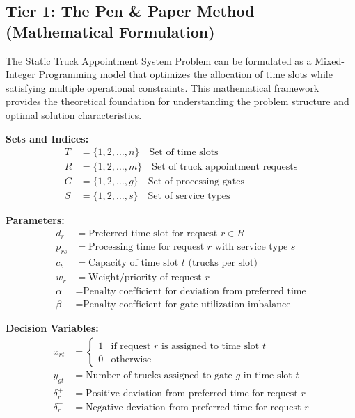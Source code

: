 \documentclass{article}
\begin{document}
\subsection{Tier 1: The Pen \& Paper Method (Mathematical Formulation)}

The Static Truck Appointment System Problem can be formulated as a Mixed-Integer Programming model that optimizes the allocation of time slots while satisfying multiple operational constraints. This mathematical framework provides the theoretical foundation for understanding the problem structure and optimal solution characteristics.

\textbf{Sets and Indices:}
\begin{align}
T &= \{1, 2, \ldots, n\} \quad \text{Set of time slots} \\
R &= \{1, 2, \ldots, m\} \quad \text{Set of truck appointment requests} \\
G &= \{1, 2, \ldots, g\} \quad \text{Set of processing gates} \\
S &= \{1, 2, \ldots, s\} \quad \text{Set of service types}
\end{align}

\textbf{Parameters:}
\begin{align}
d_r &= \text{Preferred time slot for request } r \in R \\
p_{rs} &= \text{Processing time for request } r \text{ with service type } s \\
c_t &= \text{Capacity of time slot } t \text{ (trucks per slot)} \\
w_r &= \text{Weight/priority of request } r \\
\alpha &= \text{Penalty coefficient for deviation from preferred time} \\
\beta &= \text{Penalty coefficient for gate utilization imbalance}
\end{align}

\textbf{Decision Variables:}
\begin{align}
x_{rt} &= \begin{cases}
1 & \text{if request } r \text{ is assigned to time slot } t \\
0 & \text{otherwise}
\end{cases} \\
y_{gt} &= \text{Number of trucks assigned to gate } g \text{ in time slot } t \\
\delta_r^+ &= \text{Positive deviation from preferred time for request } r \\
\delta_r^- &= \text{Negative deviation from preferred time for request } r
\end{align}
\end{document}
